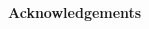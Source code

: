 \noindent
{\LARGE\textbf{Acknowledgements}}
\vspace{1cm}

\begin{spacing}{1} 
\noindent 


\end{spacing}
